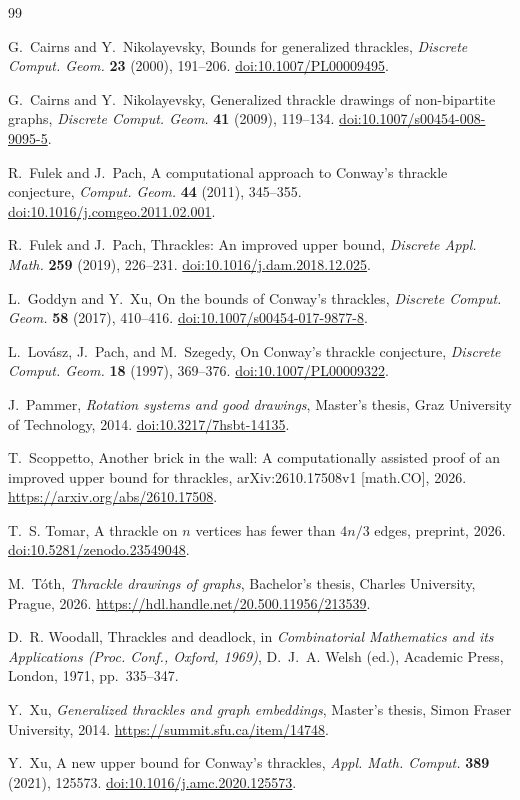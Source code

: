 \documentclass[11pt,a4paper]{article}
\begin{document}
\begin{thebibliography}{99}

G.~Cairns and Y.~Nikolayevsky,
Bounds for generalized thrackles,
\emph{Discrete Comput. Geom.} \textbf{23} (2000), 191--206.
\href{https://doi.org/10.1007/PL00009495}{doi:10.1007/PL00009495}.

G.~Cairns and Y.~Nikolayevsky,
Generalized thrackle drawings of non-bipartite graphs,
\emph{Discrete Comput. Geom.} \textbf{41} (2009), 119--134.
\href{https://doi.org/10.1007/s00454-008-9095-5}{doi:10.1007/s00454-008-9095-5}.

R.~Fulek and J.~Pach,
A computational approach to Conway's thrackle conjecture,
\emph{Comput. Geom.} \textbf{44} (2011), 345--355.
\href{https://doi.org/10.1016/j.comgeo.2011.02.001}{doi:10.1016/j.comgeo.2011.02.001}.

R.~Fulek and J.~Pach,
Thrackles: An improved upper bound,
\emph{Discrete Appl. Math.} \textbf{259} (2019), 226--231.
\href{https://doi.org/10.1016/j.dam.2018.12.025}{doi:10.1016/j.dam.2018.12.025}.

L.~Goddyn and Y.~Xu,
On the bounds of Conway's thrackles,
\emph{Discrete Comput. Geom.} \textbf{58} (2017), 410--416.
\href{https://doi.org/10.1007/s00454-017-9877-8}{doi:10.1007/s00454-017-9877-8}.

L.~Lov\'asz, J.~Pach, and M.~Szegedy,
On Conway's thrackle conjecture,
\emph{Discrete Comput. Geom.} \textbf{18} (1997), 369--376.
\href{https://doi.org/10.1007/PL00009322}{doi:10.1007/PL00009322}.

J.~Pammer,
\emph{Rotation systems and good drawings},
Master's thesis, Graz University of Technology, 2014.
\href{https://doi.org/10.3217/7hsbt-14135}{doi:10.3217/7hsbt-14135}.

T.~Scoppetto,
Another brick in the wall: A computationally assisted proof of an improved
upper bound for thrackles,
arXiv:2610.17508v1 [math.CO], 2026.
\url{https://arxiv.org/abs/2610.17508}.

T.~S. Tomar,
A thrackle on $n$ vertices has fewer than $4n/3$ edges,
preprint, 2026.
\href{https://doi.org/10.5281/zenodo.23549048}
{doi:10.5281/zenodo.23549048}.

M.~T\'oth,
\emph{Thrackle drawings of graphs},
Bachelor's thesis, Charles University, Prague, 2026.
\url{https://hdl.handle.net/20.500.11956/213539}.

D.~R. Woodall,
Thrackles and deadlock,
in \emph{Combinatorial Mathematics and its Applications
(Proc. Conf., Oxford, 1969)}, D.~J.~A. Welsh (ed.),
Academic Press, London, 1971, pp.~335--347.

Y.~Xu,
\emph{Generalized thrackles and graph embeddings},
Master's thesis, Simon Fraser University, 2014.
\url{https://summit.sfu.ca/item/14748}.

Y.~Xu,
A new upper bound for Conway's thrackles,
\emph{Appl. Math. Comput.} \textbf{389} (2021), 125573.
\href{https://doi.org/10.1016/j.amc.2020.125573}{doi:10.1016/j.amc.2020.125573}.

\end{thebibliography}
\end{document}
